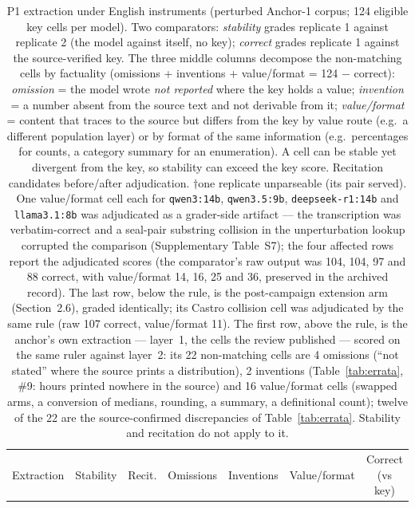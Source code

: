 \documentclass[11pt]{article}
\begin{document}
\begin{table}[H]
\centering\footnotesize
\caption{P1 extraction under English instruments (perturbed Anchor-1 corpus; 124 eligible key cells per model). Two comparators: \emph{stability} grades replicate 1 against replicate 2 (the model against itself, no key); \emph{correct} grades replicate 1 against the source-verified key. The three middle columns decompose the non-matching cells by factuality (omissions + inventions + value/format = 124 $-$ correct): \emph{omission} = the model wrote \emph{not reported} where the key holds a value; \emph{invention} = a number absent from the source text and not derivable from it; \emph{value/format} = content that traces to the source but differs from the key by value route (e.g.\ a different population layer) or by format of the same information (e.g.\ percentages for counts, a category summary for an enumeration). A cell can be stable yet divergent from the key, so stability can exceed the key score. Recitation candidates before/after adjudication. $\dagger$one replicate unparseable (its pair served). One value/format cell each for \texttt{qwen3:14b}, \texttt{qwen3.5:9b}, \texttt{deepseek-r1:14b} and \texttt{llama3.1:8b} was adjudicated as a grader-side artifact --- the transcription was verbatim-correct and a seal-pair substring collision in the unperturbation lookup corrupted the comparison (Supplementary Table~S7); the four affected rows report the adjudicated scores (the comparator's raw output was 104, 104, 97 and 88 correct, with value/format 14, 16, 25 and 36, preserved in the archived record). The last row, below the rule, is the post-campaign extension arm (Section~2.6), graded identically; its Castro collision cell was adjudicated by the same rule (raw 107 correct, value/format 11). The first row, above the rule, is the anchor's own extraction --- layer~1, the cells the review published --- scored on the same ruler against layer~2: its 22 non-matching cells are 4 omissions (``not stated'' where the source prints a distribution), 2 inventions (Table~\ref{tab:errata}, \#9: hours printed nowhere in the source) and 16 value/format cells (swapped arms, a conversion of medians, rounding, a summary, a definitional count); twelve of the 22 are the source-confirmed discrepancies of Table~\ref{tab:errata}. Stability and recitation do not apply to it.}
\label{tab:p1}
\setlength{\tabcolsep}{4pt}
\begin{tabular}{lcccccc}
\toprule
Extraction & Stability & Recit. & Omissions & Inventions & Value/format & Correct (vs key) \\

\end{tabular}
\end{table}
\end{document}
